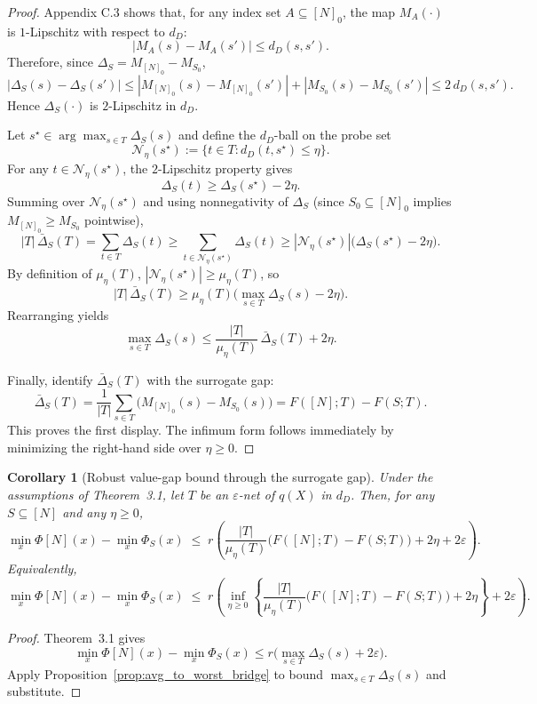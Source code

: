\documentclass[accepted]{uai2026}
\theoremstyle{plain}
\newtheorem{corollary}[theorem]{Corollary}
\theoremstyle{definition}
\theoremstyle{remark}
\begin{document}
\begin{proof}
Appendix C.3 shows that, for any index set $A \subseteq [N]_0$, the map $M_A(\cdot)$ is $1$-Lipschitz with respect to $d_D$:
\[
|M_A(s)-M_A(s')| \le d_D(s,s').
\]
Therefore, since $\Delta_S = M_{[N]_0}-M_{S_0}$,
\[
|\Delta_S(s)-\Delta_S(s')|
\le
|M_{[N]_0}(s)-M_{[N]_0}(s')|
+
|M_{S_0}(s)-M_{S_0}(s')|
\le
2\,d_D(s,s').
\]
Hence $\Delta_S(\cdot)$ is $2$-Lipschitz in $d_D$.

Let $s^\star \in \arg\max_{s \in T}\Delta_S(s)$ and define the $d_D$-ball on the probe set
\[
\mathcal{N}_\eta(s^\star) := \{t \in T : d_D(t,s^\star)\le \eta\}.
\]
For any $t \in \mathcal{N}_\eta(s^\star)$, the $2$-Lipschitz property gives
\[
\Delta_S(t)\ge \Delta_S(s^\star)-2\eta.
\]
Summing over $\mathcal{N}_\eta(s^\star)$ and using nonnegativity of $\Delta_S$ (since $S_0\subseteq [N]_0$ implies $M_{[N]_0}\ge M_{S_0}$ pointwise),
\[
|T|\,\bar{\Delta}_S(T)
=
\sum_{t \in T}\Delta_S(t)
\ge
\sum_{t \in \mathcal{N}_\eta(s^\star)}\Delta_S(t)
\ge
|\mathcal{N}_\eta(s^\star)|\bigl(\Delta_S(s^\star)-2\eta\bigr).
\]
By definition of $\mu_\eta(T)$, $|\mathcal{N}_\eta(s^\star)| \ge \mu_\eta(T)$, so
\[
|T|\,\bar{\Delta}_S(T)
\ge
\mu_\eta(T)\bigl(\max_{s \in T}\Delta_S(s)-2\eta\bigr).
\]
Rearranging yields
\[
\max_{s \in T}\Delta_S(s)
\le
\frac{|T|}{\mu_\eta(T)}\,\bar{\Delta}_S(T)+2\eta.
\]

Finally, identify $\bar{\Delta}_S(T)$ with the surrogate gap:
\[
\bar{\Delta}_S(T)
=
\frac{1}{|T|}\sum_{s \in T}\bigl(M_{[N]_0}(s)-M_{S_0}(s)\bigr)
=
F([N];T)-F(S;T).
\]
This proves the first display. The infimum form follows immediately by minimizing the right-hand side over $\eta\ge 0$.
\end{proof}

\begin{corollary}[Robust value-gap bound through the surrogate gap]
\label{cor:surrogate_to_value_gap}
Under the assumptions of Theorem~3.1, let $T$ be an $\varepsilon$-net of $q(X)$ in $d_D$. Then, for any $S \subseteq [N]$ and any $\eta \ge 0$,
\[
\min_x \Phi[N](x)-\min_x \Phi_S(x)
\;\le\;
r\left(
\frac{|T|}{\mu_\eta(T)}\bigl(F([N];T)-F(S;T)\bigr)
+
2\eta + 2\varepsilon
\right).
\]
Equivalently,
\[
\min_x \Phi[N](x)-\min_x \Phi_S(x)
\;\le\;
r\left(
\inf_{\eta\ge 0}
\left\{
\frac{|T|}{\mu_\eta(T)}\bigl(F([N];T)-F(S;T)\bigr)+2\eta
\right\}
+2\varepsilon
\right).
\]
\end{corollary}

\begin{proof}
Theorem~3.1 gives
\[
\min_x \Phi[N](x)-\min_x \Phi_S(x)
\le
r\bigl(\max_{s \in T}\Delta_S(s)+2\varepsilon\bigr).
\]
Apply Proposition~\ref{prop:avg_to_worst_bridge} to bound $\max_{s \in T}\Delta_S(s)$ and substitute.
\end{proof}
\end{document}
